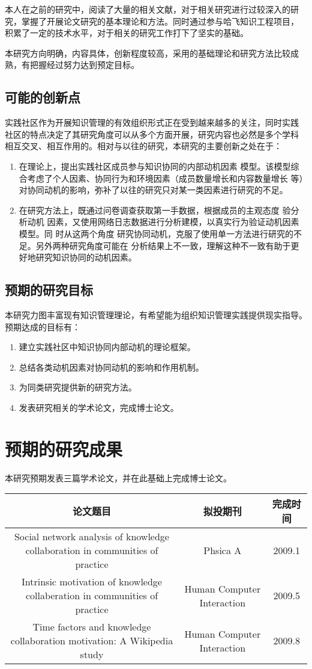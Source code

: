 \documentclass[12pt,a4paper,cs4size]{ctexart}
\begin{document}
本人在之前的研究中，阅读了大量的相关文献，对于相关研究进行过较深入的研
究，掌握了开展论文研究的基本理论和方法。同时通过参与哈飞知识工程项目，
积累了一定的技术水平，对于相关的研究工作打下了坚实的基础。

本研究方向明确，内容具体，创新程度较高，采用的基础理论和研究方法比较成
熟，有把握经过努力达到预定目标。
\subsection{可能的创新点}
实践社区作为开展知识管理的有效组织形式正在受到越来越多的关注，同时实践
社区的特点决定了其研究角度可以从多个方面开展，研究内容也必然是多个学科
相互交叉、相互作用的。相对与以往的研究，本研究的主要创新之处在于：
\begin{enumerate}
\item 在理论上，提出实践社区成员参与知识协同的内部动机因素
  模型。该模型综合考虑了个人因素、协同行为和环境因素（成员数量增长和内容数量增长
  等）对协同动机的影响，弥补了以往的研究只对某一类因素进行研究的不足。
\item  在研究方法上，既通过问卷调查获取第一手数据，根据成员的主观态度
  验分析动机
  因素，又使用网络日志数据进行分析建模，以真实行为验证动机因素模型。同
  时从这两个角度
  研究协同动机，克服了使用单一方法进行研究的不足。另外两种研究角度可能在
  分析结果上不一致，理解这种不一致有助于更好地研究知识协同的动机因素。

\end{enumerate}
\subsection{预期的研究目标}
本研究力图丰富现有知识管理理论，有希望能为组织知识管理实践提供现实指导。
预期达成的目标有：
\begin{enumerate}
\item 建立实践社区中知识协同内部动机的理论框架。
\item  总结各类动机因素对协同动机的影响和作用机制。
\item 为同类研究提供新的研究方法。
\item  发表研究相关的学术论文，完成博士论文。
\end{enumerate}
\section{预期的研究成果}
本研究预期发表三篇学术论文，并在此基础上完成博士论文。
\\[1em]
\begin{center}
  

\begin{tabular}[center]{|c|c|c|}
\hline
论文题目&拟投期刊&完成时间\\
\hline
 \parbox{7cm}{ Social network analysis of knowledge collaboration in 
communities of  practice}&Phsica A&2009.1\\
\hline
 \parbox{7cm}{Intrinsic motivation of knowledge collaberation in 
communities of practice}&Human Computer Interaction&2009.5\\
\hline
 \parbox{7cm}{Time factors and knowledge collaboration motivation: 
A Wikipedia study }&Human Computer Interaction&2009.8\\
\hline
\end{tabular}
\end{center}
\end{document}
